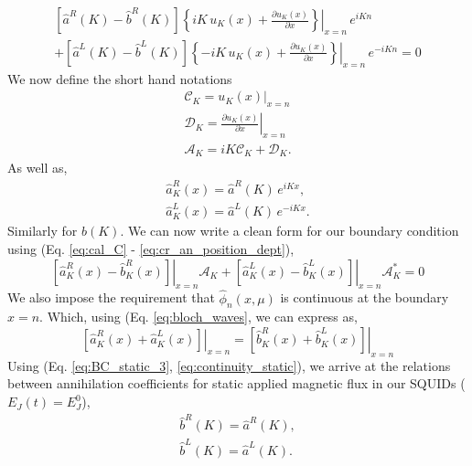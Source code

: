 %
\begin{equation}\label{eq:BC_static_2}
\begin{split}
    \left[\hat{a}^R(K) - \hat{b}^R(K)\right]\left.\left\lbrace i K \, u_K(x) + \frac{\partial u_K(x)}{\partial x}\right\rbrace\right|_{x=n}\,e^{i K n}
    \\[2mm]
    +
    \left[\hat{a}^L(K) - \hat{b}^L(K)\right]\left.\left\lbrace-i K\, u_K(x) + \frac{\partial u_K(x)}{\partial x}\right\rbrace\right|_{x=n}\,e^{-i K n} = 0 
\end{split}
\end{equation}
%
We now define the short hand notations
%
\begin{gather}
    \mathcal{C}_K = \left.u_K(x)\right|_{x=n}
    \label{eq:cal_C}\\
    \mathcal{D}_K = \left.\frac{\partial u_K(x)}{\partial x}\right|_{x=n}
    \label{eq:cal_D}\\
    \mathcal{A}_K = iK\mathcal{C}_K + \mathcal{D}_K.
    \label{eq:cal_A}
\end{gather}
%
As well as, 
\begin{subequations}\label{eq:cr_an_position_dept}
\begin{eqnarray}
    \hat{a}^R_K(x) = \hat{a}^R(K)\,e^{i K x},
    \\
    \hat{a}^L_K(x) = \hat{a}^L(K)\,e^{-i K x}. 
\end{eqnarray}
\end{subequations}
%
Similarly for $\hat{b}(K)$. We can now write a clean form for our boundary condition using (Eq. \ref{eq:cal_C} - \ref{eq:cr_an_position_dept}),
%
\begin{equation}\label{eq:BC_static_3}
    \left.\left[\hat{a}^R_K(x) - \hat{b}_K^R(x)\right]\right|_{x=n} \mathcal{A}_K
    +
    \left.\left[\hat{a}^L_K(x) - \hat{b}^L_K(x)\right]\right|_{x=n}\mathcal{A}^*_K = 0 
\end{equation}
%
We also impose the requirement that $\hat{\phi}_n(x,\mu)$ is continuous at the boundary $x=n$. Which, using (Eq. \ref{eq:bloch_waves}, we can express as,
%
\begin{equation}\label{eq:continuity_static}
    \left.\left[\hat{a}^R_K(x) + \hat{a}^L_K(x)\right]\right|_{x=n}
    =
    \left.\left[\hat{b}^R_K(x) + \hat{b}^L_K(x)\right]\right|_{x=n}
\end{equation}
%
Using (Eq. \ref{eq:BC_static_3}, \ref{eq:continuity_static}), we arrive at the relations between annihilation coefficients for static applied magnetic flux in our SQUIDs ($E_J(t)= E^0_J$),
%
\begin{subequations}\label{eq:static_solutions}
\begin{eqnarray}
    \hat{b}^R(K) = \hat{a}^R(K),
    \\
    \hat{b}^L(K) = \hat{a}^L(K).
\end{eqnarray}
\end{subequations}
